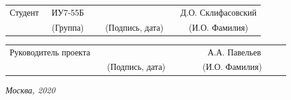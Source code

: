 \documentclass[14pt, a4paper]{extarticle}
\begin{document}
\noindent
{}
\\

\noindent
{}
\\

\vspace{1.5cm}
\noindent
\begin{tabular}{l c c c c c}
	Студент      & ~ИУ7-55Б~               & \hspace{2.5cm} & \hspace{2cm}                 & &  Д.О. Склифасовский \\\cline{2-2}\cline{4-4} \cline{6-6} 
	\hspace{3cm} & {\footnotesize(Группа)} &                & {\footnotesize(Подпись, дата)} & & {\footnotesize(И.О. Фамилия)}
\end{tabular}

\noindent
\begin{tabular}{l c c c c}
	Руководитель проекта & \hspace{3.5cm}   & \hspace{2cm}                 & & ~~~~~~А.А. Павельев~~~~~\\\cline{3-3} \cline{5-5} 
	\hspace{3cm}  &                & {\footnotesize(Подпись, дата)} & & {\footnotesize(И.О. Фамилия)}
\end{tabular}

\vspace{0.6cm}
\begin{center}	
	\vfill
	\large \textit {Москва, 2020}
\end{center}

\thispagestyle {empty}
\pagebreak

\clearpage
\tableofcontents

\clearpage
\end{document}

